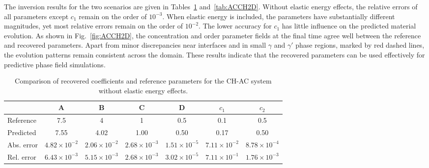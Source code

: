 \documentclass[11pt,reqno]{amsart}
\begin{document}
The inversion results for the two scenarios are given in Tables~\ref{tab:ACCH2D_NE} and~\ref{tab:ACCH2D}. Without elastic energy effects, the relative errors of all parameters except $c_1$ remain on the order of $10^{-3}$. When elastic energy is included, the parameters have substantially different magnitudes, yet most relative errors remain on the order of $10^{-2}$. The lower accuracy for $c_1$ has little influence on the predicted material evolution. As shown in Fig.~\ref{fig:ACCH2D}, the concentration and order parameter fields at the final time agree well between the reference and recovered parameters. Apart from minor discrepancies near interfaces and in small $\gamma$ and $\gamma'$ phase regions, marked by red dashed lines, the evolution patterns remain consistent across the domain. These results indicate that the recovered parameters can be used effectively for predictive phase field simulations.

\begin{table}[htbp]
  \centering
  \caption{Comparison of recovered coefficients and reference parameters for the CH-AC system without elastic energy effects.}
  \begin{tabular}{l *{6}{c}} 
    \toprule
    & {A} & {B} & {C} & {D} & {$c_1$} & {$c_2$} \\
    \midrule
    Reference    & 7.5    & 4      & 1      & 0.5    & 0.1    & 0.5   \\
    Predicted    & 7.55   & 4.02   & 1.00   & 0.50   & 0.17   & 0.50  \\
    \midrule
    Abs. error   & $4.82 \times 10^{-2}$ & $2.06 \times 10^{-2}$ & $2.68 \times 10^{-3}$ & $1.51 \times 10^{-5}$ & $7.11 \times 10^{-2}$ & $8.78 \times 10^{-4}$ \\
    Rel. error   & $6.43 \times 10^{-3}$ & $5.15 \times 10^{-3}$ & $2.68 \times 10^{-3}$ & $3.02 \times 10^{-5}$ & $7.11 \times 10^{-1}$ & $1.76 \times 10^{-3}$ \\
    \bottomrule
  \end{tabular}
   
       \label{tab:ACCH2D_NE}
\end{table}
\end{document}
